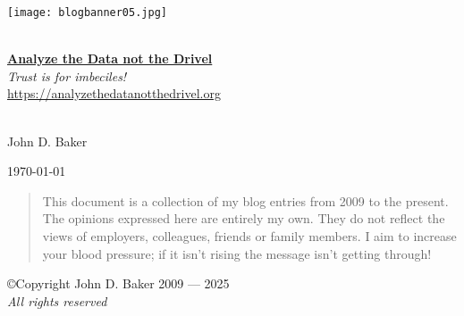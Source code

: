 %

\begin{titlepage}
 
\begin{center}

\texttt{[image: blogbanner05.jpg]}
 
\HRule \\[0.8cm]

{\Huge \href{https://analyzethedatanotthedrivel.org}{\textbf{Analyze the Data not the Drivel}}}\\[0.4cm]

\textsl{Trust is for imbeciles!}\\[0.4cm]

\url{https://analyzethedatanotthedrivel.org}\\[0.4cm]
 
\HRule \\[0.8cm]
 
 
\begin{minipage}{0.45\textwidth}
\begin{flushleft}
{\large John D. Baker} \\
\end{flushleft}
\end{minipage}
\begin{minipage}{0.45\textwidth}
\begin{flushright}
{\large \today} \\
\end{flushright}
\end{minipage}

\vspace{2cm}

\begin{quotation}
This document is a collection of my blog entries from 2009 to the present. The
opinions expressed here are entirely my own.
They do not reflect the views of employers, colleagues, friends or family members.
I aim to increase your blood pressure; if it isn't
rising the message isn't getting through!
\end{quotation}

\vfill

\copyright Copyright John D. Baker 2009 --- 2025 \\
\emph{All rights reserved} \\

 
\end{center}


 
\end{titlepage}

%
